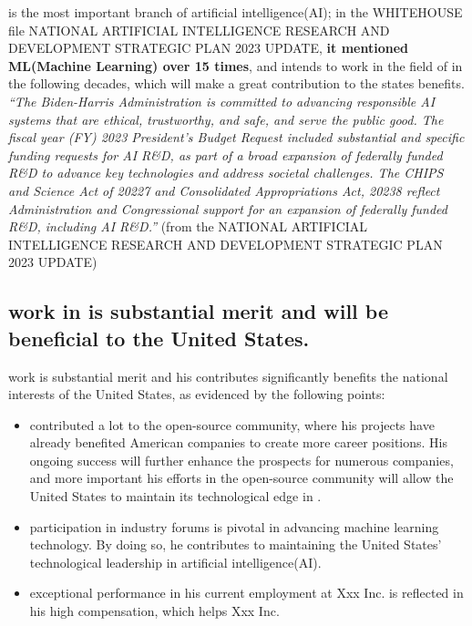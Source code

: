 \documentclass[11pt]{article}
\let\oldenquote\enquote
\renewcommand{\enquote}[1]{{\itshape\oldenquote{#1}}}
\begin{document}
\fie{} is the most important branch of artificial intelligence(AI); in the WHITEHOUSE file NATIONAL ARTIFICIAL INTELLIGENCE RESEARCH AND DEVELOPMENT STRATEGIC PLAN 2023 UPDATE, \textbf{it mentioned ML(Machine Learning) over 15 times}, and \dr intends to work in the field of \fie{} in the following decades, which will make a great contribution to the states benefits. \\

\enquote{The Biden-Harris Administration is committed to advancing responsible AI systems that are ethical,
trustworthy, and safe, and serve the public good. The fiscal year (FY) 2023 President’s Budget Request
included substantial and specific funding requests for AI R\&D, as part of a broad expansion of federally
funded R\&D to advance key technologies and address societal challenges. The CHIPS and Science Act of
20227 and Consolidated Appropriations Act, 20238 reflect Administration and Congressional support for
an expansion of federally funded R\&D, including AI R\&D.} (from the NATIONAL ARTIFICIAL INTELLIGENCE RESEARCH AND DEVELOPMENT STRATEGIC PLAN 2023 UPDATE) \\


\subsection{ \drs work in \fie{} is substantial merit and will be beneficial to the United States. }
\label{section22}

\drs work is substantial merit and his contributes significantly benefits the national interests of the United States, as evidenced by the following points:


\begin{itemize}
    \item \dr contributed a lot to the open-source community, where his projects have already benefited American companies to create more career positions. His ongoing success will further enhance the prospects for numerous companies, and more important his efforts in the open-source community will allow the United States to maintain its technological edge in \fie{}.

    \item \drs participation in industry forums is pivotal in advancing machine learning technology. By doing so, he contributes to maintaining the United States' technological leadership in artificial intelligence(AI).
    
    \item \drs exceptional performance in his current employment at Xxx Inc. is reflected in his high compensation, which helps Xxx Inc.
\end{itemize}
\end{document}
